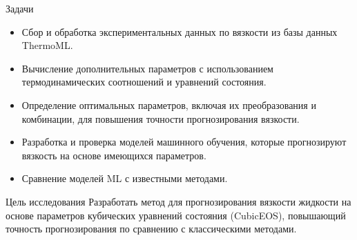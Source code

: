 \documentclass[aspectratio=169]{beamer}
\begin{document}
\begin{frame}{Задачи}
    \begin{itemize}
        \item Сбор и обработка экспериментальных данных по вязкости из базы данных ThermoML.
        \item Вычисление дополнительных параметров с использованием термодинамических соотношений и уравнений состояния.
        \item Определение оптимальных параметров, включая их преобразования и комбинации, для повышения точности прогнозирования вязкости.
        \item Разработка и проверка моделей машинного обучения, которые прогнозируют вязкость на основе имеющихся параметров.
        \item Сравнение моделей ML с известными методами.
    \end{itemize}
\end{frame}

\begin{frame}{Цель исследования}
    Разработать метод для прогнозирования вязкости жидкости на основе параметров кубических уравнений состояния (CubicEOS), повышающий точность прогнозирования по сравнению с классическими методами.
\end{frame}
\end{document}
